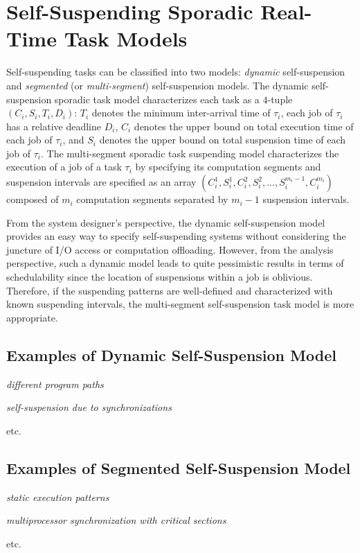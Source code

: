\section{Self-Suspending Sporadic Real-Time Task Models}
  
Self-suspending tasks can be classified into two models: \emph{dynamic} self-suspension and \emph{segmented} (or \emph{multi-segment}) self-suspension models. 
The dynamic self-suspension sporadic task model characterizes each task as a $4$-tuple $(C_i,S_i,T_i,D_i)$: $T_i$ denotes the minimum inter-arrival time of $\tau_i$, each job of $\tau_i$ has a relative deadline $D_i$,
$C_i$ denotes the upper bound on total execution time of each job of $\tau_i$,
and $S_i$ denotes the upper bound on total suspension time of each job of $\tau_i$. The multi-segment sporadic task suspending model characterizes the execution of a job of a task $\tau_i$ by  specifying its computation segments and suspension intervals are specified as an array
$(C_{i}^1,S_{i}^1,C_{i}^2,S_{i}^2,...,S_{i}^{m_i-1},C_{i}^{m_i})$ composed of $m_i$ computation segments separated by $m_i-1$ suspension intervals. 

From the system designer's perspective, the dynamic self-suspension model provides an easy way to specify self-suspending systems without considering the juncture of I/O access or computation offloading. 
However, from the analysis perspective, such a  dynamic model leads to quite pessimistic results in terms of schedulability since the location of suspensions within a job is oblivious. Therefore, if the suspending patterns are well-defined and characterized with known suspending intervals, the multi-segment self-suspension task model is more appropriate.   

\subsection{Examples of Dynamic Self-Suspension Model} 
  \textit{different program paths}
  
  \textit{self-suspension due to synchronizations}
  
  etc.
  
\subsection{Examples of Segmented Self-Suspension Model} 
  \textit{static execution patterns}
  
  \textit{multiprocessor synchronization with critical sections}
 
  etc.
  
  
  
  